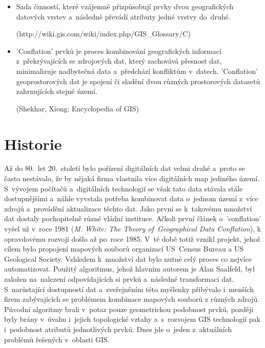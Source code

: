 \begin{itemize}
  \item Sada činností, které vzájemně přizpůsobují prvky dvou geografických datových vrstev a~následně převádí atributy jedné vrstvy do~druhé. %
    
    (http://wiki.gis.com/wiki/index.php/GIS\_Glossary/C)
  
  \item 'Conflation' prvků je proces kombinování geografických informací z~překrývajících se zdrojových dat, který zachovává přesnost dat, minimalizuje nadbytečná data
    a~předchází konfliktům v~datech. %
    'Conflation' geoprostorových dat je spojení či sladění dvou různých prostorových datasetů zahrnujících stejné území.
    
    (Shekhar, Xiong: Encyclopedia of GIS)
\end{itemize}

\section{Historie} %
\label{historie}

Až do 80.~let 20.~století bylo pořízení digitálních dat velmi drahé a~proto se často nestávalo, že by nějaká firma vlastnila více digitálních map jediného území. S~vývojem
počítačů a~digitálních technologií se však tato data stávala stále dostupnějšími a~náhle vyvstala potřeba kombinovat data o~jednom území z~více zdrojů a~provádění aktualizace
těchto dat. Jako první se k~takovému množství dat dostaly pochopitelně různé vládní instituce. Ačkoli první článek o~'conflation' vyšel už v~roce 1981 (\textit{M. White:
The Theory of~Geographical Data Conflation}), k opravdovému rozvoji došlo až po~roce 1985. V~té době totiž vznikl projekt, jehož cílem bylo propojení mapových souborů organizací
US~Census Bureau a US Geological Society. Vzhledem k~množství dat bylo nutné celý proces co nejvíce automatizovat. Použitý algoritmus, jehož hlavním autorem je Alan Saalfeld, 
byl založen na~nalezení odpovídajících si prvků a~následné transformaci dat. S~narůstající dostupností dat a~zveřejněním této myšlenky přibývalo i~menších firem zabývajících
se problémem kombinace mapových souborů z různých zdrojů. Původní algoritmy brali v~potaz pouze geometrickou podobnost prvků, později byly brány v~úvahu
i~jejich topologické vztahy a~s~rozvojem GIS technologií pak i~podobnost atributů jednotlivých prvků. Dnes jde o~jeden z~aktuálních problémů řešených v~oblasti GIS.


